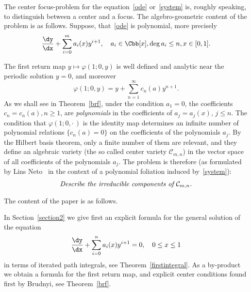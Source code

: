 The center focus-problem for the equation~\eqref{ode} or~\eqref{system} is, roughly speaking, to distinguish between a center and a focus. The algebro-geometric content of the problem is as follows. Suppose, that~\eqref{ode} is polynomial, more precisely
\begin{align}\label{ode2}
\frac{\dy}{\dx} + \sum_{i=0}^m a_i(x) y^{i+1},\quad a_i \in \Cbb[x], \deg a_i \leq n, x \in [0,1].
\end{align}

The first return map $y \mapsto \varphi(1;0,y)$ is well defined and analytic near the periodic solution $y=0$, and moreover
\[
\varphi(1;0,y) = y + \sum_{n=1}^\infty c_n(a) y^{n+1}.
\]
As we shall see in Theorem~\ref{brf}, under the condition $a_1=0$, the coefficients\linebreak $c_n=c_n(a), n\geq 1$, are \emph{polynomials} in the coefficients of $a_j = a_j(x)$, $j\leq n$. The condition that $\varphi(1;0,{\cdot\,})$ is the identity map determines an infinite number of polynomial relations $\{ c_n(a)=0 \}$ on the coefficients of the polynomials $a_j$. By the Hilbert basis theorem, only a finite number of them are relevant, and they define an algebraic variety (the so called center variety $\mathcal C_{m,n}$) in the vector space of all coefficients of the polynomials $a_j$. The problem is therefore (as formulated by Lins Neto~\cite{lins14} in the context of a polynomial foliation induced by~\eqref{system}):
\[
\text{\emph{Describe the irreducible components of $\mathcal C_{m,n}$.}}
\]

\goodbreak
The content of the paper is as follows.

In Section~\ref{section2} we give first an explicit formula for the general solution of the equation
\[
\frac{\dy}{\dx} + \sum_{i=0}^n a_i(x) y^{i+1} = 0,\quad 0\leq x \leq 1
\]
in terms of iterated path integrals, see Theorem~\ref{firstintegral}. As a by-product we obtain a formula for the first return map, and explicit center conditions found first by Brudnyi, see Theorem~\ref{brf}.



